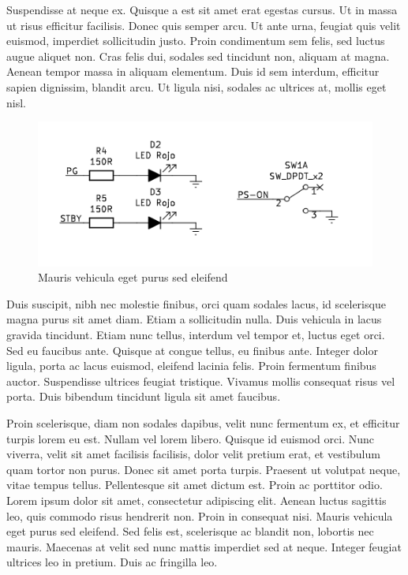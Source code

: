 Suspendisse at neque ex. Quisque a est sit amet erat egestas cursus. Ut in massa ut risus efficitur facilisis. Donec quis semper arcu. Ut ante urna, feugiat quis velit euismod, imperdiet sollicitudin justo. Proin condimentum sem felis, sed luctus augue aliquet non. Cras felis dui, sodales sed tincidunt non, aliquam at magna. Aenean tempor massa in aliquam elementum. Duis id sem interdum, efficitur sapien dignissim, blandit arcu. Ut ligula nisi, sodales ac ultrices at, mollis eget nisl.

\begin{figure}[h]
    \centering
    \includegraphics[width=\textwidth]{figures/chapterC/leds.png}
    \caption{Mauris vehicula eget purus sed eleifend}
    \label{C_leds}
\end{figure}

Duis suscipit, nibh nec molestie finibus, orci quam sodales lacus, id scelerisque magna purus sit amet diam. Etiam a sollicitudin nulla. Duis vehicula in lacus gravida tincidunt. Etiam nunc tellus, interdum vel tempor et, luctus eget orci. Sed eu faucibus ante. Quisque at congue tellus, eu finibus ante. Integer dolor ligula, porta ac lacus euismod, eleifend lacinia felis. Proin fermentum finibus auctor. Suspendisse ultrices feugiat tristique. Vivamus mollis consequat risus vel porta. Duis bibendum tincidunt ligula sit amet faucibus.

Proin scelerisque, diam non sodales dapibus, velit nunc fermentum ex, et efficitur turpis lorem eu est. Nullam vel lorem libero. Quisque id euismod orci. Nunc viverra, velit sit amet facilisis facilisis, dolor velit pretium erat, et vestibulum quam tortor non purus. Donec sit amet porta turpis. Praesent ut volutpat neque, vitae tempus tellus. Pellentesque sit amet dictum est. Proin ac porttitor odio. Lorem ipsum dolor sit amet, consectetur adipiscing elit. Aenean luctus sagittis leo, quis commodo risus hendrerit non. Proin in consequat nisi. Mauris vehicula eget purus sed eleifend. Sed felis est, scelerisque ac blandit non, lobortis nec mauris. Maecenas at velit sed nunc mattis imperdiet sed at neque. Integer feugiat ultrices leo in pretium. Duis ac fringilla leo.

